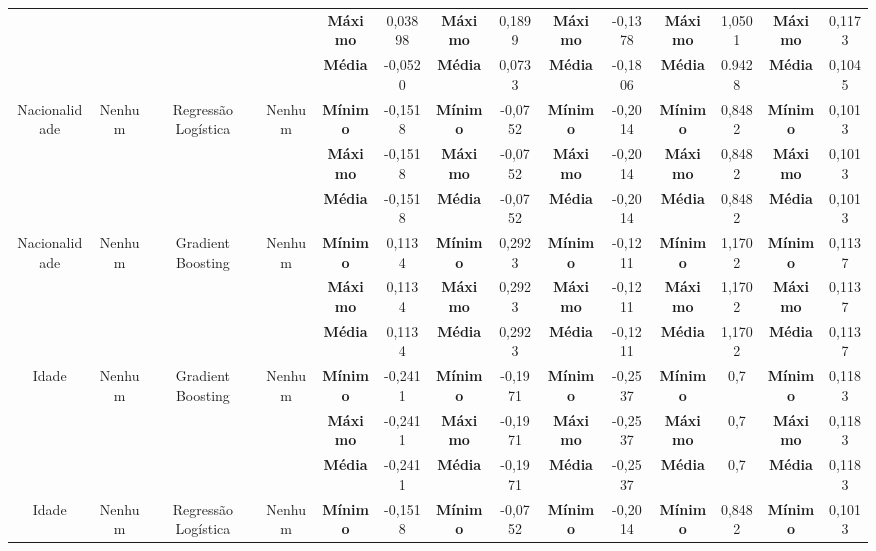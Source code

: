 \documentclass[Portugues,Final]{ic-tese-v3}
\begin{document}
\begin{table}[H]
\begin{center}
{\begin{tabular}{c|c|c|c|c|c|c|c|c|c|c|c|c|c}
             & & & & \textbf{Máximo} & 0,03898 & \textbf{Máximo} & 0,1899 & \textbf{Máximo} & -0,1378 & \textbf{Máximo} & 1,0501 & \textbf{Máximo} & 0,1173 \\
             & & & & \textbf{Média} & -0,0520 & \textbf{Média} & 0,0733 & \textbf{Média} & -0,1806 & \textbf{Média} & 0.9428 & \textbf{Média} & 0,1045 \\
            \hline
            \multirow{3}{*}{Nacionalidade} & \multirow{3}{*}{Nenhum} & \multirow{3}{*}{Regressão Logística} & \multirow{3}{*}{Nenhum} & \textbf{Mínimo} & -0,1518 & \textbf{Mínimo} & -0,0752 & \textbf{Mínimo} & -0,2014 & \textbf{Mínimo} & 0,8482 & \textbf{Mínimo} & 0,1013 \\
             & & & & \textbf{Máximo} & -0,1518 & \textbf{Máximo} & -0,0752 & \textbf{Máximo} & -0,2014 & \textbf{Máximo} & 0,8482 & \textbf{Máximo} & 0,1013 \\
             & & & & \textbf{Média} & -0,1518 & \textbf{Média} & -0,0752 & \textbf{Média} & -0,2014 & \textbf{Média} & 0,8482 & \textbf{Média} & 0,1013 \\
            \hline
            \multirow{3}{*}{Nacionalidade} & \multirow{3}{*}{Nenhum} & \multirow{3}{*}{Gradient Boosting} & \multirow{3}{*}{Nenhum} & \textbf{Mínimo} & 0,1134 & \textbf{Mínimo} & 0,2923 & \textbf{Mínimo} & -0,1211 & \textbf{Mínimo} & 1,1702 & \textbf{Mínimo} & 0,1137 \\
             & & & & \textbf{Máximo} & 0,1134 & \textbf{Máximo} & 0,2923 & \textbf{Máximo} & -0,1211 & \textbf{Máximo} & 1,1702 & \textbf{Máximo} & 0,1137 \\
             & & & & \textbf{Média} & 0,1134 & \textbf{Média} & 0,2923 & \textbf{Média} & -0,1211 & \textbf{Média} & 1,1702 & \textbf{Média} & 0,1137 \\
            \hline
            \multirow{3}{*}{Idade} & \multirow{3}{*}{Nenhum} & \multirow{3}{*}{Gradient Boosting} & \multirow{3}{*}{Nenhum} & \textbf{Mínimo} & -0,2411 & \textbf{Mínimo} & -0,1971 & \textbf{Mínimo} & -0,2537 & \textbf{Mínimo} & 0,7 & \textbf{Mínimo} & 0,1183 \\
             & & & & \textbf{Máximo} & -0,2411 & \textbf{Máximo} & -0,1971 & \textbf{Máximo} & -0,2537 & \textbf{Máximo} & 0,7 & \textbf{Máximo} & 0,1183 \\
             & & & & \textbf{Média} & -0,2411 & \textbf{Média} & -0,1971 & \textbf{Média} & -0,2537 & \textbf{Média} & 0,7 & \textbf{Média} & 0,1183 \\
            \hline
            \multirow{3}{*}{Idade} & \multirow{3}{*}{Nenhum} & \multirow{3}{*}{Regressão Logística} & \multirow{3}{*}{Nenhum} & \textbf{Mínimo} & -0,1518 & \textbf{Mínimo} & -0,0752 & \textbf{Mínimo} & -0,2014 & \textbf{Mínimo} & 0,8482 & \textbf{Mínimo} & 0,1013 \\

\end{tabular}}
\end{center}
\end{table}
\end{document}
